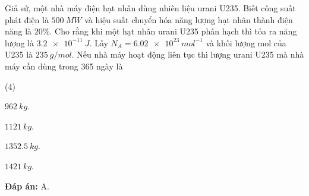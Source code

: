 {		Giả sử, một nhà máy điện hạt nhân dùng nhiên liệu urani U235. Biết công suất phát điện là $ \SI{500}{MW} $ và hiệu suất chuyển hóa năng lượng hạt nhân thành điện năng là $ 20 \% $. Cho rằng khi một hạt nhân urani U235 phân hạch thì tỏa ra năng lượng là $ \SI{3,2 e-11}{J} $. Lấy $ N_{A} = \SI{6,02 e23}{mol^{-1}} $ và khối lượng mol của U235 là $ \SI{235}{g/mol} $. Nếu nhà máy hoạt động liên tục thì lượng urani U235 mà nhà máy cần dùng trong 365 ngày là
		\begin{mcq}(4)
			\item $ \SI{962}{kg} $.
			\item $ \SI{1121}{kg} $.
			\item $ \SI{1352,5}{kg} $.
			\item $ \SI{1421}{kg} $.
		\end{mcq}	
	
	\textbf{Đáp án:} A.
}




